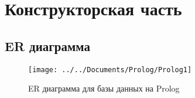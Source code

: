 \chapter{Конструкторская часть}

\section{ER диаграмма}
\begin{figure}[h]
	\centering
	\texttt{[image: ../../Documents/Prolog/Prolog1]} %
	\caption{ER диаграмма для базы данных на Prolog}
	\label{fig:prolog1}
\end{figure}
\clearpage

